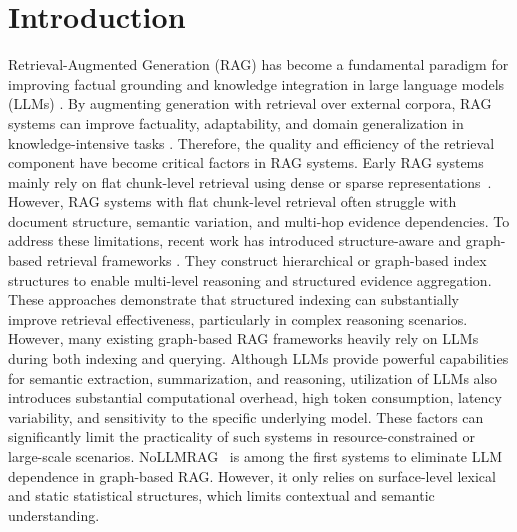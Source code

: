 \documentclass[conference]{IEEEtran}
\begin{document}
\section{Introduction}
Retrieval-Augmented Generation (RAG) \cite{lewis2020retrieval,borgeaud2022improving,izacard2021leveraging,zhao2026retrieval} has become a fundamental paradigm for improving factual grounding and knowledge integration in large language models (LLMs) \cite{brown2020language,devlin2019bert}.  By augmenting generation with retrieval over external corpora, RAG systems can improve factuality, adaptability, and domain generalization in knowledge-intensive tasks \cite{guu2020retrieval}. Therefore, the quality and efficiency of the retrieval component have become critical factors in RAG systems. Early RAG systems mainly rely on flat chunk-level retrieval using dense or sparse representations~\cite{karpukhin2020dense,khattab2020colbert}. However, RAG systems with flat chunk-level retrieval often struggle with document structure, semantic variation, and multi-hop evidence dependencies. To address these limitations, recent work has introduced structure-aware and graph-based retrieval frameworks \cite{sarthi2024raptor,gutierrez2024hipporag,edge2024local,guo2024lightrag}. They construct hierarchical or graph-based index structures to enable multi-level reasoning and structured evidence aggregation. These approaches demonstrate that structured indexing can substantially improve retrieval effectiveness, particularly in complex reasoning scenarios. However, many existing graph-based RAG frameworks heavily rely on LLMs during both indexing and querying. Although LLMs provide powerful capabilities for semantic extraction, summarization, and reasoning, utilization of LLMs also introduces substantial computational overhead, high token consumption, latency variability, and sensitivity to the specific underlying model. These factors can significantly limit the practicality of such systems in resource-constrained or large-scale scenarios. NoLLMRAG~\cite{yunollmrag} is among the first systems to eliminate LLM dependence in graph-based RAG. However, it only relies on surface-level lexical and static statistical structures, which limits contextual and semantic understanding.
\end{document}
